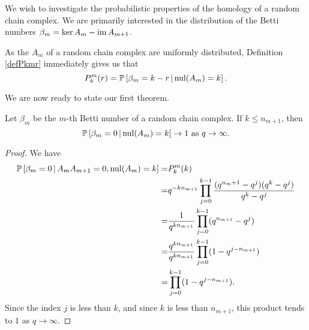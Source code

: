 We wish to investigate the probabilistic properties of the homology of a random
chain complex.  We are primarily interested in the distribution of the Betti
numbers $\beta_m = \ker A_m - \operatorname{\mathrm{im}} A_{m+1}$.


\begin{remark}
As the $A_m$ of a random chain complex are uniformly distributed, Definition
\ref{defPkmr} immediately gives us that
\[
  P^m_k(r) = \mathbb{P}\left[\beta_m = k-r \,|\, \mathrm{nul}(A_{m}) = k\right].
\]
\end{remark}



We are now ready to state our first theorem.


\begin{lemma}
  \label{lem:condqtoinfty}
Let $\beta_m$ be the $m$-th Betti number of a random chain complex.  If $k\leq n_{m+1}$, then
\[
\mathbb{P}\left[\beta_m= 0 \,|\, \mathrm{nul}(A_{m}) = k \right] \to 1 \textrm{ as } q\to\infty.
\]
\end{lemma}
\begin{proof}
We have
	\begin{align*}
	\mathbb{P}\left[\beta_m = 0 \,|\, A_{m}A_{m+1} = 0, \mathrm{nul}(A_{m}) = k \right]
    =& P^m_k(k)\\
    =& q^{-kn_{m+1}}\prod_{j=0}^{k-1} \frac{(q^{n_m+1}-q^j) (q^k - q^j)}{q^k - q^j}  \\
		=& \frac{1}{q^{kn_{m+1}}} \prod_{j=0}^{k-1}(q^{n_{m+1}} - q^j) \\
		=& \frac{q^{kn_{m+1}}}{q^{kn_{m+1}}}\prod_{j=0}^{k-1}(1-q^{j-n_{m+1}})\\
		=& \prod_{j=0}^{k-1} (1-q^{j-n_{m+1}}).
	\end{align*}
Since the index $j$ is less than $k$, and since $k$ is less than $n_{m+1}$, this product tends to $1$ as $q\to\infty$.  
\end{proof}


